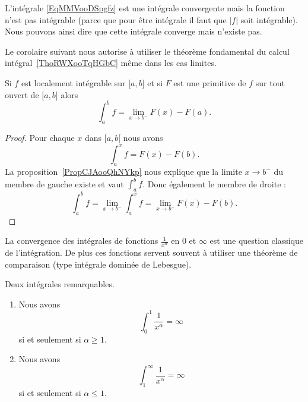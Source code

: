 L'intégrale \eqref{EqMMVooDSpgfz} est une intégrale convergente mais la fonction n'est pas intégrable (parce que pour être intégrale il faut que \( | f |\) soit intégrable). Nous pouvons ainsi dire que cette intégrale converge mais n'existe pas.

Le corolaire suivant nous autorise à utiliser le théorème fondamental du calcul intégral~\ref{ThoRWXooTqHGbC} même dans les cas limites.
\begin{corollary}   \label{CorMUIooXREleR}
    Si \( f\) est localement intégrable sur \( \mathopen[ a , b \mathclose]\) et si \( F\) est une primitive de \( f\) sur tout ouvert de \( \mathopen[ a , b \mathclose]\) alors
    \begin{equation}
        \int_a^bf=\lim_{x\to b^-} F(x)-F(a).
    \end{equation}
\end{corollary}

\begin{proof}
    Pour chaque \( x\) dans \( \mathopen[ a , b [\) nous avons
    \begin{equation}
        \int_a^xf=F(x)-F(b).
    \end{equation}
    La proposition~\ref{PropCJAooQhNYkp} nous explique que la limite \( x\to b^-\) du membre de gauche existe et vaut \( \int_a^bf\). Donc également le membre de droite :
    \begin{equation}
        \int_a^bf=\lim_{x\to b^-} \int_a^xf=\lim_{x\to b^-} F(x)-F(b).
    \end{equation}
\end{proof}

La convergence des intégrales de fonctions \( \frac{1}{ x^{\alpha} }\) en \( 0\) et \( \infty\) est une question classique de l'intégration. De plus ces fonctions servent souvent à utiliser une théorème de comparaison (type intégrale dominée de Lebesgue).
\begin{proposition} \label{PropBKNooPDIPUc}
    Deux intégrales remarquables.
    \begin{enumerate}
        \item

            Nous avons
    \begin{equation}
        \int_0^1\frac{1}{ x^\alpha }=\infty
    \end{equation}
    si et seulement si \( \alpha\geq 1\).

\item   \label{ITEMooJFSXooHmgmEj}

    Nous avons
    \begin{equation}
        \int_1^{\infty}\frac{1}{ x^{\alpha} }=\infty
    \end{equation}
    si et seulement si \( \alpha\leq1\).

    \end{enumerate}

\end{proposition}

